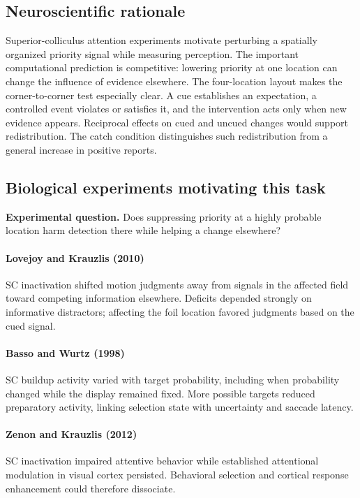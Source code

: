 \documentclass[11pt]{article}
\begin{document}
\subsection{Neuroscientific rationale}
Superior-colliculus attention experiments motivate perturbing a spatially organized priority signal while measuring perception. The important computational prediction is competitive: lowering priority at one location can change the influence of evidence elsewhere. The four-location layout makes the corner-to-corner test especially clear. A cue establishes an expectation, a controlled event violates or satisfies it, and the intervention acts only when new evidence appears. Reciprocal effects on cued and uncued changes would support redistribution. The catch condition distinguishes such redistribution from a general increase in positive reports.

\subsection{Biological experiments motivating this task}
\textbf{Experimental question.} Does suppressing priority at a highly probable location harm detection there while helping a change elsewhere?

\paragraph{Lovejoy and Krauzlis (2010)} SC inactivation shifted motion judgments away from signals in the affected field toward competing information elsewhere. Deficits depended strongly on informative distractors; affecting the foil location favored judgments based on the cued signal. \cite{bio_lovejoy}

\paragraph{Basso and Wurtz (1998)} SC buildup activity varied with target probability, including when probability changed while the display remained fixed. More possible targets reduced preparatory activity, linking selection state with uncertainty and saccade latency. \cite{bio_basso}

\paragraph{Zenon and Krauzlis (2012)} SC inactivation impaired attentive behavior while established attentional modulation in visual cortex persisted. Behavioral selection and cortical response enhancement could therefore dissociate. \cite{bio_zenon}
\end{document}
